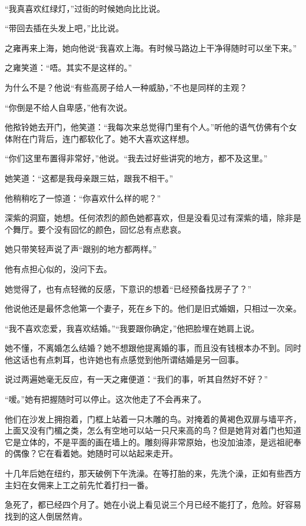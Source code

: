 \par  
\par “我真喜欢红绿灯，”过街的时候她向比比说。
\par “带回去插在头发上吧，”比比说。
\par 之雍再来上海，她向他说“我喜欢上海。有时候马路边上干净得随时可以坐下来。”
\par 之雍笑道：“唔。其实不是这样的。”
\par 为什么不是？他说“有些高房子给人一种威胁，”不也是同样的主观？
\par “你倒是不给人自卑感，”他有次说。
\par 他揿铃她去开门，他笑道：“我每次来总觉得门里有个人。”听他的语气仿佛有个女体附在门背后，连门都软化了。她不大喜欢这样想。
\par “你们这里布置得非常好，”他说。“我去过好些讲究的地方，都不及这里。”
\par 她笑道：“这都是我母亲跟三姑，跟我不相干。”
\par 他稍稍吃了一惊道：“你喜欢什么样的呢？”
\par 深紫的洞窟，她想。任何浓烈的颜色她都喜欢，但是没看见过有深紫的墙，除非是个舞厅。要个没有回忆的颜色，回忆总有点悲哀。
\par 她只带笑轻声说了声“跟别的地方都两样。”
\par 他有点担心似的，没问下去。
\par 她觉得了，也有点轻微的反感，下意识的想着“已经预备找房子了？”
\par 他说他还是最怀念他第一个妻子，死在乡下的。他们是旧式婚姻，只相过一次亲。
\par “我不喜欢恋爱，我喜欢结婚。”“我要跟你确定，”他把脸埋在她肩上说。
\par 她不懂，不离婚怎么结婚？她不想跟他提离婚的事，而且没有钱根本办不到。同时他这话也有点刺耳，也许她也有点感觉到他所谓结婚是另一回事。
\par 说过两遍她毫无反应，有一天之雍便道：“我们的事，听其自然好不好？”
\par “嗳。”她有把握随时可以停止。这次他走了不会再来了。
\par 他们在沙发上拥抱着，门框上站着一只木雕的鸟。对掩着的黄褐色双扉与墙平齐，上面又没有门楣之类，怎么有空地可以站一只尺来高的鸟？但是她背对着门也知道它是立体的，不是平面的画在墙上的。雕刻得非常原始，也没加油漆，是远祖祀奉的偶像？它在看着她。她随时可以站起来走开。
\par 十几年后她在纽约，那天破例下午洗澡。在等打胎的来，先洗个澡，正如有些西方主妇在女佣来上工之前先忙着打扫一番。
\par 急死了，都已经四个月了。她在小说上看见说三个月已经不能打了，危险。好容易找到的这人倒居然肯。
